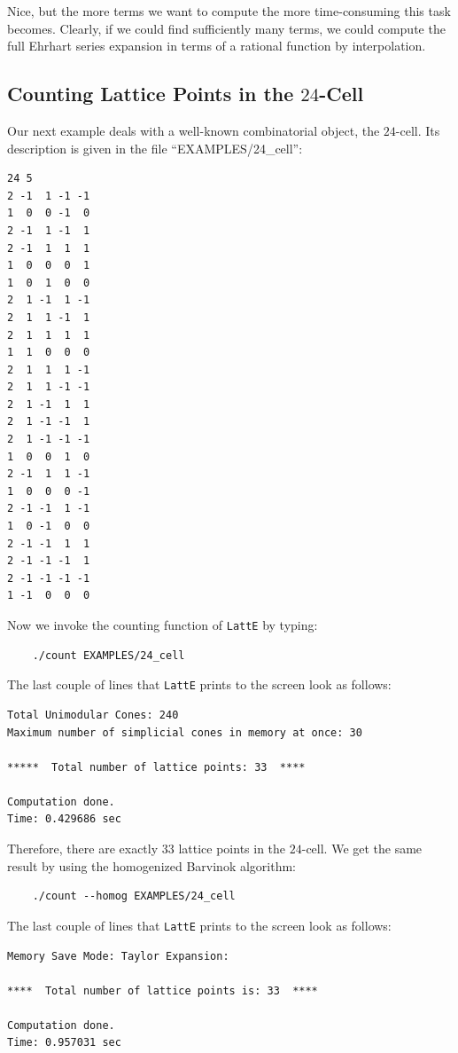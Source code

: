 \documentclass{article}
\begin{document}
Nice, but the more terms we want to compute the more time-consuming
this task becomes. Clearly, if we could find sufficiently many
terms, we could compute the full Ehrhart series expansion in terms of
a rational function by interpolation.

\subsection{Counting Lattice Points in the $24$-Cell}
Our next example deals with a well-known combinatorial object, the
$24$-cell. Its description is given in the file ``EXAMPLES/24\_cell'':
\begin{verbatim}
24 5 
2 -1  1 -1 -1
1  0  0 -1  0
2 -1  1 -1  1
2 -1  1  1  1
1  0  0  0  1
1  0  1  0  0
2  1 -1  1 -1
2  1  1 -1  1
2  1  1  1  1
1  1  0  0  0
2  1  1  1 -1
2  1  1 -1 -1
2  1 -1  1  1
2  1 -1 -1  1
2  1 -1 -1 -1
1  0  0  1  0
2 -1  1  1 -1
1  0  0  0 -1
2 -1 -1  1 -1
1  0 -1  0  0
2 -1 -1  1  1
2 -1 -1 -1  1
2 -1 -1 -1 -1
1 -1  0  0  0
\end{verbatim}
Now we invoke the counting function of {\tt LattE} by typing:
\begin{verbatim}
    ./count EXAMPLES/24_cell
\end{verbatim}
The last couple of lines that {\tt LattE} prints to the screen
look as follows:
\begin{verbatim}
Total Unimodular Cones: 240
Maximum number of simplicial cones in memory at once: 30

*****  Total number of lattice points: 33  ****

Computation done. 
Time: 0.429686 sec
\end{verbatim}
Therefore, there are exactly $33$ lattice points in the $24$-cell. We
get the same result by using the homogenized Barvinok algorithm:
\begin{verbatim}
    ./count --homog EXAMPLES/24_cell
\end{verbatim}
The last couple of lines that {\tt LattE} prints to the screen
look as follows:
\begin{verbatim}
Memory Save Mode: Taylor Expansion:

****  Total number of lattice points is: 33  ****

Computation done. 
Time: 0.957031 sec
\end{verbatim}

\end{document}
